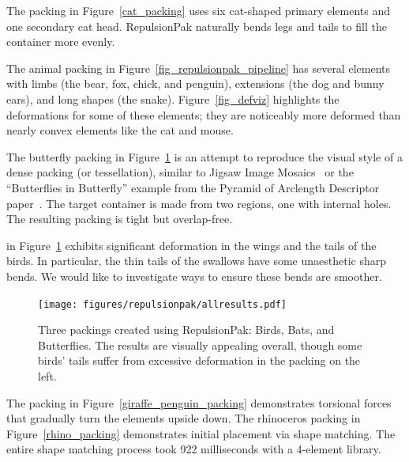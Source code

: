 The packing in Figure~\ref{cat_packing} 
uses six cat-shaped primary elements and one secondary cat head.
RepulsionPak naturally bends legs and tails to fill the container more evenly.

The animal packing in Figure~\ref{fig_repulsionpak_pipeline} 
has several elements with limbs (the bear, fox, chick, and penguin),  
extensions (the dog and bunny ears), and long shapes (the snake).
Figure~\ref{fig_defviz} highlights the deformations for some of these elements;
they are noticeably more deformed 
than nearly convex elements like the cat and mouse.


The butterfly packing in Figure~\ref{three_packings} is an attempt to reproduce 
the visual style of a dense packing (or tessellation), similar to Jigsaw Image Mosaics~\cite{Kim2002}
or the ``Butterflies in Butterfly'' example from the
Pyramid of Arclength Descriptor paper~\cite{Kwan2016}. 
The target container is made from two regions,
one with internal holes.  The resulting packing is tight but overlap-free.

 in Figure~\ref{three_packings}
exhibits significant deformation in the wings and the tails of the birds.
In particular, the thin tails of the swallows have some unaesthetic
sharp bends.  We would like to investigate ways to ensure these bends are
smoother.



\begin{figure}
\centering
\texttt{[image: figures/repulsionpak/allresults.pdf]} 
\caption[Three packings created using RepulsionPak: Birds, Bats, and Butterflies]
{\label{three_packings} Three packings created using RepulsionPak: Birds, Bats, and Butterflies. The results are visually appealing overall, though some birds' tails suffer from excessive deformation in
the packing on the left.}
\end{figure}

The packing in Figure~\ref{giraffe_penguin_packing} demonstrates torsional forces
that gradually turn the elements upside down. 
The rhinoceros packing in Figure~\ref{rhino_packing} demonstrates initial placement via shape matching.
The entire shape matching process took 922 milliseconds with a 4-element library.



